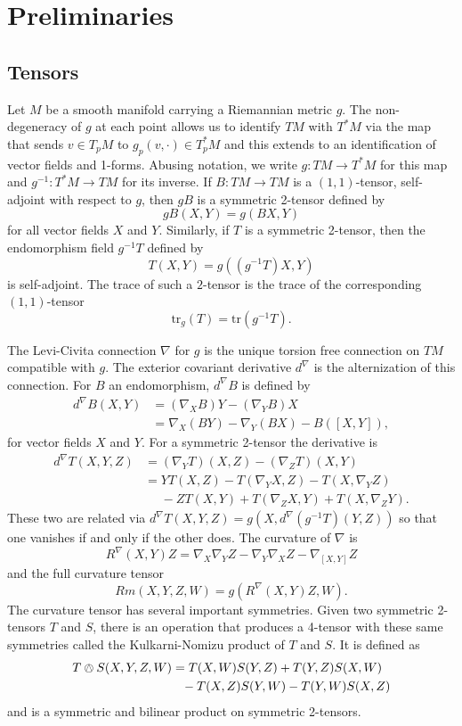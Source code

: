 \documentclass{amsart}
\newcommand{\tr}{\mathrm{tr}}
\begin{document}
\section{Preliminaries}


\subsection{Tensors}

Let $M$ be a smooth manifold carrying a Riemannian metric $g$. 
The non-degeneracy of $g$ at each point allows us to identify $TM$ with $T^*M$ via the map that sends $v \in T_pM$ to $g_p(v,\cdot) \in T^*_pM$ and this extends to an identification of vector fields and 1-forms. 
Abusing notation, we write $g: TM \to T^*M$ for this map and $g^{-1}:T^*M \to TM$ for its inverse.
If $B:TM \to TM$ is a $(1,1)$-tensor, self-adjoint with respect to $g$, then $gB$ is a symmetric 2-tensor defined by
\[
gB(X,Y) = g(BX,Y)
\]
for all vector fields $X$ and $Y$.
Similarly, if $T$ is a symmetric 2-tensor, then the endomorphism field $g^{-1}T$ defined by 
\[
T(X,Y) = g( (g^{-1}T)X,Y)
\]
is self-adjoint.
The trace of such a $2$-tensor is the trace of the corresponding $(1,1)$-tensor
\[
\tr_g(T) = \tr(g^{-1}T).
\]

The Levi-Civita connection $\nabla$ for $g$ is the unique torsion free connection on $TM$ compatible with $g$.
The exterior covariant derivative $d^\nabla$ is the alternization of this connection.
For $B$ an endomorphism, $d^\nabla B$ is defined by
\begin{align*}
d^\nabla B(X,Y) &= (\nabla_XB)Y - (\nabla_YB)X \\
&= \nabla_X(BY)- \nabla_Y(BX) - B([X,Y]),
\end{align*}
for vector fields $X$ and $Y$.
For a symmetric 2-tensor the derivative is 
\begin{align*}
d^\nabla T(X,Y,Z)
&= (\nabla_YT)(X,Z)- (\nabla_Z T)(X,Y) \\
&= YT(X,Z) - T(\nabla_YX,Z) - T(X,\nabla_YZ) \\
&\phantom{=} - ZT(X,Y) + T(\nabla_ZX,Y) + T(X,\nabla_ZY).
\end{align*}
These two are related via $d^\nabla T(X,Y,Z) = g(X, d^\nabla(g^{-1}T)(Y,Z))$ so that one vanishes if and only if the other does.
The curvature of $\nabla$ is 
\[
R^\nabla(X,Y)Z = \nabla_X\nabla_Y Z - \nabla_Y\nabla_X Z - \nabla_{[X,Y]}Z
\]
and the full curvature tensor 
\[
Rm(X,Y,Z,W) = g(R^\nabla(X,Y)Z,W).
\]
The curvature tensor has several important symmetries.
Given two symmetric 2-tensors $T$ and $S$, there is an operation that produces a 4-tensor with these same symmetries called the Kulkarni-Nomizu product of $T$ and $S$. 
It is defined as
\begin{align*}
T \owedge S(X,Y,Z,W)
&= T(X,W)S(Y,Z) + T(Y,Z)S(X,W) \\
&\phantom{=} - T(X,Z)S(Y,W) - T(Y,W)S(X,Z)
\end{align*}
and is a symmetric and bilinear product on symmetric 2-tensors.
\end{document}
